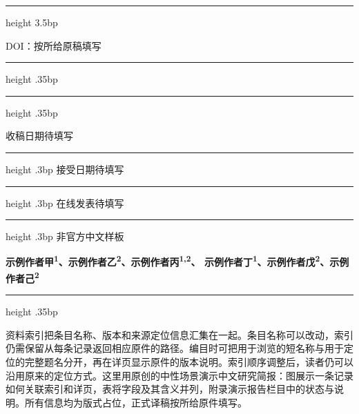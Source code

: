 \documentclass[UTF8,fontset=none,scheme=plain]{ctexart}
\renewcommand{\normalsize}{\fontsize{9.15bp}{12.4bp}\selectfont}
\newcommand{\LetterType}{\sffamily\bfseries\fontsize{9bp}{11bp}\selectfont 研究简报\enspace Letter}
\newcommand{\LetterIdentifier}{\sffamily\fontsize{8bp}{10bp}\selectfont\textcolor{LetterBlue}{DOI：按所给原稿填写}}
\begin{document}
\normalsize
\thispagestyle{letteropening}
\vspace*{-25bp}
{\color{LetterPink}\hrule height 3.5bp}\vspace{5bp}
\vspace{37bp}
\noindent{\LetterType}\hfill{\LetterIdentifier}\par
\vspace{3bp}\hrule height .35bp\vspace{5bp}
\vspace{23bp}\hrule height .35bp\vspace{6bp}
\noindent\begin{minipage}[t]{.317\textwidth}
  \vspace{0pt}\sffamily\fontsize{8bp}{11.3bp}\selectfont
  收稿日期\enspace 待填写\par\vspace{4bp}\hrule height .3bp\vspace{4bp}
  接受日期\enspace 待填写\par\vspace{4bp}\hrule height .3bp\vspace{4bp}
  在线发表\enspace 待填写\par\vspace{4bp}\hrule height .3bp\vspace{4bp}
  非官方中文样板
\end{minipage}\hfill
\begin{minipage}[t]{.655\textwidth}
  \vspace{0pt}\setlength{\parindent}{0pt}
  {\sffamily\bfseries\fontsize{9bp}{12.1bp}\selectfont
  示例作者甲\textsuperscript{1}、示例作者乙\textsuperscript{2}、示例作者丙\textsuperscript{1,2}、
  示例作者丁\textsuperscript{1}、示例作者戊\textsuperscript{2}、示例作者己\textsuperscript{2}\par}
  \vspace{6bp}\hrule height .35bp\vspace{7bp}
  {\fontsize{11bp}{15.2bp}\selectfont 资料索引把条目名称、版本和来源定位信息汇集在一起。条目名称可以改动，索引仍需保留从每条记录返回相应原件的路径。编目时可把用于浏览的短名称与用于定位的完整题名分开，再在详页显示原件的版本说明。索引顺序调整后，读者仍可以沿用原来的定位方式。这里用原创的中性场景演示中文研究简报：图展示一条记录如何关联索引和详页，表将字段及其含义并列，附录演示报告栏目中的状态与说明。所有信息均为版式占位，正式译稿按所给原件填写。\par}
\end{minipage}
\par\vspace{13bp}
\end{document}
